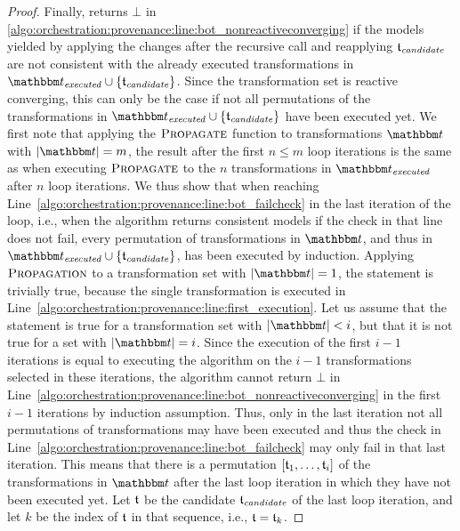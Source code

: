 \begin{proof}
    Finally,  returns $\bot$ in \autoref{algo:orchestration:provenance:line:bot_nonreactiveconverging} if the models yielded by applying the changes after the recursive call and reapplying $\provalgcandidate$ are not consistent with the already executed transformations in $\provalgexecuted \cup \setted{\provalgcandidate}$.
    Since the transformation set is reactive converging, this can only be the case if not all permutations of the transformations in $\provalgexecuted \cup 
    \setted{\provalgcandidate}$ have been executed yet.
    We first note that applying the $\textsc{Propagate}$ function to transformations $\transformationset{t}$ with $\abs{\transformationset{t}} = m$, the result after the first $n \leq m$ loop iterations is the same as when executing $\textsc{Propagate}$ to the $n$ transformations in $\provalgexecuted$ after $n$ loop iterations.
    We thus show that when reaching Line~\ref{algo:orchestration:provenance:line:bot_failcheck} in the last iteration of the loop, i.e., when the algorithm returns consistent models if the check in that line does not fail, every permutation of transformations in $\transformationset{t}$, and thus in $\provalgexecuted \cup \setted{\provalgcandidate}$, has been executed by induction.
    Applying $\textsc{Propagation}$ to a transformation set with $\abs{\transformationset{t}} = 1$, the statement is trivially true, because the single transformation is executed in Line~\ref{algo:orchestration:provenance:line:first_execution}.
    Let us assume that the statement is true for a transformation set with $\abs{\transformationset{t}} < i$, but that it is not true for a set with $\abs{\transformationset{t}} = i$.
    Since the execution of the first $i-1$ iterations is equal to executing the algorithm on the $i-1$ transformations selected in these iterations, the algorithm cannot return $\bot$ in Line~\ref{algo:orchestration:provenance:line:bot_nonreactiveconverging} in the first $i-1$ iterations by induction assumption.
    Thus, only in the last iteration not all permutations of transformations may have been executed and thus the check in Line~\ref{algo:orchestration:provenance:line:bot_failcheck} may only fail in that last iteration.
    This means that there is a permutation $\sequenced{\transformation{t}_{1}, \dots, \transformation{t}_{i}}$ of the transformations in $\transformationset{t}$ after the last loop iteration in which they have not been executed yet.
    Let $\transformation{t}$ be the candidate $\provalgcandidate$ of the last loop iteration, and let $k$ be the index of $\transformation{t}$ in that sequence, i.e., $\transformation{t} = \transformation{t}_{k}$.

\end{proof}
